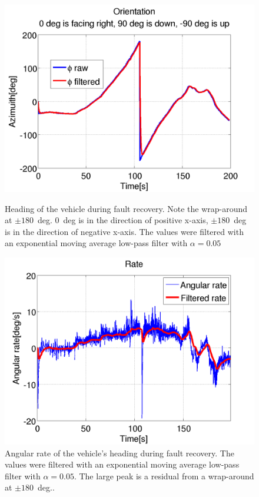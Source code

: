 \begin{figure}
\centering
{}
\includegraphics[width=\textwidth]{Files/Figures/faultrec_2016-06-21_14-26-34-orientation.png}
\caption[Orientation during fault recovery]{Heading of the vehicle during fault recovery. Note the wrap-around at $\pm180$~deg. 0~deg is in the direction of positive x-axis, $\pm180$~deg is in the direction of negative x-axis. The values were filtered with an exponential moving average low-pass filter with $\alpha=0.05$}
\label{fig:fault_recovery_orientation}
\endminipage\hfill
{}
\includegraphics[width=\textwidth]{Files/Figures/faultrec_2016-06-21_14-26-34-ang_rate.png}
\caption[Angular rate during fault recovery]{Angular rate of the vehicle's heading during fault recovery. The values were filtered with an exponential moving average low-pass filter with $\alpha=0.05$. The large peak is a residual from a wrap-around at $\pm180$~deg.\newline.}
\label{fig:fault_recovery_ang_rate}
\endminipage\hfill
\end{figure}

